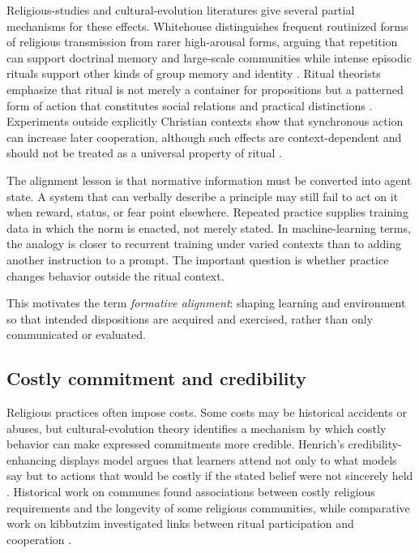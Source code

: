 \documentclass[11pt]{article}
\begin{document}
Religious-studies and cultural-evolution literatures give several partial mechanisms for these effects. Whitehouse distinguishes frequent routinized forms of religious transmission from rarer high-arousal forms, arguing that repetition can support doctrinal memory and large-scale communities while intense episodic rituals support other kinds of group memory and identity \parencite{whitehouse2004modes}. Ritual theorists emphasize that ritual is not merely a container for propositions but a patterned form of action that constitutes social relations and practical distinctions \parencite{bell1992ritual,rappaport1999ritual}. Experiments outside explicitly Christian contexts show that synchronous action can increase later cooperation, although such effects are context-dependent and should not be treated as a universal property of ritual \parencite{wiltermuth2009synchrony}.

The alignment lesson is that normative information must be converted into agent state. A system that can verbally describe a principle may still fail to act on it when reward, status, or fear point elsewhere. Repeated practice supplies training data in which the norm is enacted, not merely stated. In machine-learning terms, the analogy is closer to recurrent training under varied contexts than to adding another instruction to a prompt. The important question is whether practice changes behavior outside the ritual context.

This motivates the term \emph{formative alignment}: shaping learning and environment so that intended dispositions are acquired and exercised, rather than only communicated or evaluated.

\subsection{Costly commitment and credibility}

Religious practices often impose costs. Some costs may be historical accidents or abuses, but cultural-evolution theory identifies a mechanism by which costly behavior can make expressed commitments more credible. Henrich's credibility-enhancing displays model argues that learners attend not only to what models say but to actions that would be costly if the stated belief were not sincerely held \parencite{henrich2009cred}. Historical work on communes found associations between costly religious requirements and the longevity of some religious communities, while comparative work on kibbutzim investigated links between ritual participation and cooperation \parencite{sosis2003commune,sosisruffle2003ritual}.
\end{document}
